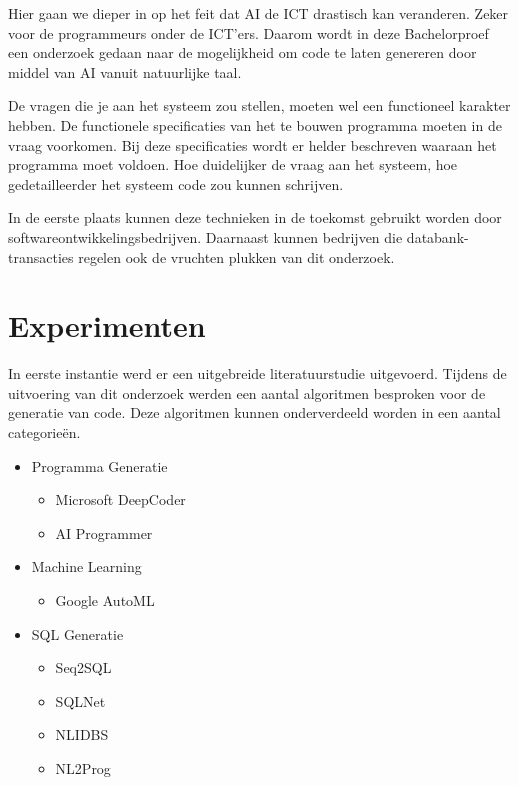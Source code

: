 \documentclass[a0,portrait]{a0poster}
\begin{document}
\begin{multicols}{2}
Hier gaan we dieper in op het feit dat AI de ICT drastisch kan veranderen. Zeker voor de programmeurs onder de ICT’ers. Daarom wordt in deze Bachelorproef een onderzoek gedaan naar de mogelijkheid om code te laten genereren door middel van AI vanuit natuurlijke taal.

De vragen die je aan het systeem zou stellen, moeten wel een functioneel karakter hebben. De functionele specificaties van het te bouwen programma moeten in de vraag voorkomen. Bij deze specificaties wordt er helder beschreven waaraan het programma moet voldoen. Hoe duidelijker de vraag aan het systeem, hoe gedetailleerder het systeem code zou kunnen schrijven.

In de eerste plaats kunnen deze technieken in de toekomst gebruikt worden door softwareontwikkelingsbedrijven. Daarnaast kunnen bedrijven die databank-transacties regelen ook de vruchten plukken van dit onderzoek.


\color{Black} %
\color{HoGentAccent1} 
\section*{Experimenten}
\color{black}

In eerste instantie werd er een uitgebreide literatuurstudie uitgevoerd. Tijdens de uitvoering van dit onderzoek werden een aantal algoritmen besproken voor de generatie van code. Deze algoritmen kunnen onderverdeeld worden in een aantal categorieën. 

\begin{itemize}
	\item Programma Generatie
		\begin{itemize}
			\item Microsoft DeepCoder
			\item AI Programmer
		\end{itemize}
	\item Machine Learning
	\begin{itemize}
		\item Google AutoML
	\end{itemize}
	\item SQL Generatie
	\begin{itemize}
		\item Seq2SQL
		\item SQLNet
		\item NLIDBS
		\item NL2Prog
	\end{itemize}
\end{itemize}


\end{multicols}
\end{document}
